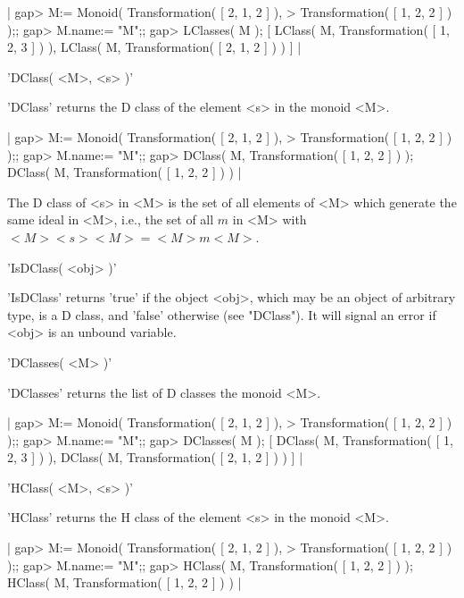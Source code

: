 |    gap> M:= Monoid( Transformation( [ 2, 1, 2 ] ),
    > Transformation( [ 1, 2, 2 ] ) );;
    gap> M.name:= "M";;
    gap> LClasses( M );
    [ LClass( M, Transformation( [ 1, 2, 3 ] ) ), 
      LClass( M, Transformation( [ 2, 1, 2 ] ) ) ] |


'DClass( <M>, <s> )'

'DClass' returns the D class of the element <s> in the monoid <M>.

|    gap> M:= Monoid( Transformation( [ 2, 1, 2 ] ),
    > Transformation( [ 1, 2, 2 ] ) );;
    gap> M.name:= "M";;
    gap> DClass( M, Transformation( [ 1, 2, 2 ] ) );
    DClass( M, Transformation( [ 1, 2, 2 ] ) ) |

The D  class  of <s> in  <M>  is the set   of all elements  of  <M> which
generate the same ideal in <M>, i.e., the set of all $m$ in <M> with $<M>
<s> <M> = <M> m <M>$.

%

'IsDClass( <obj> )'

'IsDClass' returns 'true' if the object <obj>, which  may be an object of
arbitrary type, is  a D class, and 'false'  otherwise (see "DClass").  It
will signal an error if <obj> is an unbound variable.


'DClasses( <M> )'

'DClasses' returns the list of D classes the monoid <M>.

|    gap> M:= Monoid( Transformation( [ 2, 1, 2 ] ),
    > Transformation( [ 1, 2, 2 ] ) );;
    gap> M.name:= "M";;
    gap> DClasses( M );
    [ DClass( M, Transformation( [ 1, 2, 3 ] ) ), 
      DClass( M, Transformation( [ 2, 1, 2 ] ) ) ] |


'HClass( <M>, <s> )'

'HClass' returns the H class of the element <s> in the monoid <M>.

|    gap> M:= Monoid( Transformation( [ 2, 1, 2 ] ),
    > Transformation( [ 1, 2, 2 ] ) );;
    gap> M.name:= "M";;
    gap> HClass( M, Transformation( [ 1, 2, 2 ] ) );
    HClass( M, Transformation( [ 1, 2, 2 ] ) ) |

